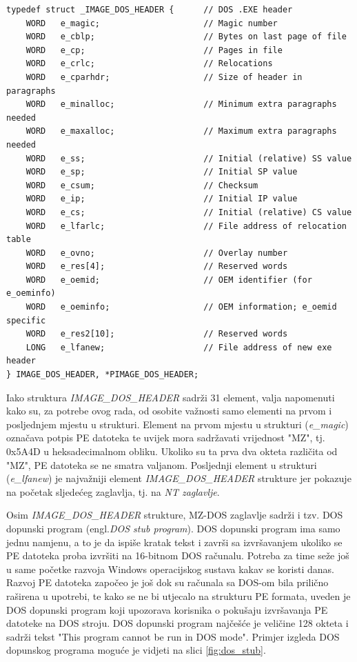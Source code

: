 \documentclass[times, utf8, diplomski, numeric]{fer}
\begin{document}
\begin{lstlisting}[frame=single, caption=IMAGE\_DOS\_HEADER struktura, label={lst:imgDosHeader}]
typedef struct _IMAGE_DOS_HEADER {      // DOS .EXE header
	WORD   e_magic;                     // Magic number
	WORD   e_cblp;                      // Bytes on last page of file
	WORD   e_cp;                        // Pages in file
	WORD   e_crlc;                      // Relocations
	WORD   e_cparhdr;                   // Size of header in paragraphs
	WORD   e_minalloc;                  // Minimum extra paragraphs needed
	WORD   e_maxalloc;                  // Maximum extra paragraphs needed
	WORD   e_ss;                        // Initial (relative) SS value
	WORD   e_sp;                        // Initial SP value
	WORD   e_csum;                      // Checksum
	WORD   e_ip;                        // Initial IP value
	WORD   e_cs;                        // Initial (relative) CS value
	WORD   e_lfarlc;                    // File address of relocation table
	WORD   e_ovno;                      // Overlay number
	WORD   e_res[4];                    // Reserved words
	WORD   e_oemid;                     // OEM identifier (for e_oeminfo)
	WORD   e_oeminfo;                   // OEM information; e_oemid specific
	WORD   e_res2[10];                  // Reserved words
	LONG   e_lfanew;                    // File address of new exe header
} IMAGE_DOS_HEADER, *PIMAGE_DOS_HEADER;
\end{lstlisting}
Iako struktura \emph{IMAGE\_DOS\_HEADER} sadrži 31 element, valja napomenuti kako su, za potrebe ovog rada, od osobite važnosti samo elementi na prvom i posljednjem mjestu u strukturi. Element na prvom mjestu u strukturi (\emph{e\_magic}) označava potpis PE datoteka te uvijek mora sadržavati vrijednost "MZ", tj. 0x5A4D u heksadecimalnom obliku. Ukoliko su ta prva dva okteta različita od "MZ", PE datoteka se ne smatra valjanom. Posljednji element u strukturi (\emph{e\_lfanew}) je najvažniji element \emph{IMAGE\_DOS\_HEADER} strukture jer pokazuje na početak sljedećeg zaglavlja, tj. na \emph{NT zaglavlje}.

Osim \emph{IMAGE\_DOS\_HEADER} strukture, MZ-DOS zaglavlje sadrži i tzv. DOS dopunski program (engl.\emph{DOS stub program})\citep{dos_stub}. DOS dopunski program ima samo jednu namjenu, a to je da ispiše kratak tekst i završi sa izvršavanjem ukoliko se PE datoteka proba izvršiti na 16-bitnom DOS računalu. Potreba za time seže još u same početke razvoja Windows operacijskog sustava kakav se koristi danas. Razvoj PE datoteka započeo je još dok su računala sa DOS-om bila prilično raširena u upotrebi, te kako se ne bi utjecalo na strukturu PE formata, uveden je DOS dopunski program koji upozorava korisnika o pokušaju izvršavanja PE datoteke na DOS stroju. DOS dopunski program najčešće je veličine 128 okteta i sadrži tekst "This program cannot be run in DOS mode". Primjer izgleda DOS dopunskog programa moguće je vidjeti na slici \ref{fig:dos_stub}.
\end{document}
